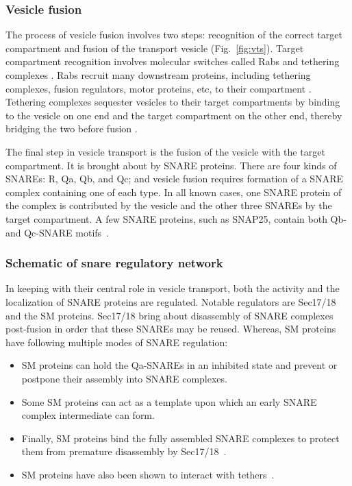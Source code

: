 \subsubsection{Vesicle fusion} 
The process of vesicle fusion involves two steps: recognition of the correct target compartment and fusion of the transport vesicle (Fig.~\ref{fig:vts}). 
%
Target compartment recognition involves molecular
switches called Rabs and tethering complexes \cite{rink2005rab}. 
%
Rabs recruit many downstream proteins, including tethering complexes, fusion regulators, motor proteins, etc, to their compartment \cite{muller2018molecular}. 
%
Tethering complexes sequester vesicles to their target compartments by binding to the vesicle on one end and the target compartment on the other end, thereby bridging the two
before fusion \cite{baker2016chaperoning}.

%
The final step in vesicle transport is the fusion of the vesicle with the target compartment. 
%
It is brought about by SNARE proteins.
%
There are four kinds of SNAREs: R, Qa, Qb, and Qc; and vesicle fusion requires formation of a SNARE complex containing one of each type. 
%
In all known cases, one SNARE protein of the complex is contributed by the vesicle and the other three SNAREs by the target compartment. 
%
A few SNARE proteins, such as SNAP25, contain both Qb- and Qc-SNARE motifs~\cite{yoon2018snare}.

\subsubsection{Schematic of snare regulatory network}
In keeping with their central role in vesicle transport, both the activity and the localization of SNARE proteins are regulated. Notable regulators are Sec17/18 and the SM proteins.
%
Sec17/18 bring about disassembly of SNARE complexes post-fusion in order that these SNAREs may be reused. 
%
Whereas, SM proteins have following multiple modes of SNARE regulation: 
\begin{itemize}
	\item SM proteins can hold
	the Qa-SNAREs in an inhibited state and prevent or postpone their assembly into SNARE
	complexes.
	\item Some SM proteins can act as a template upon which an early SNARE complex intermediate can form.
	\item Finally, SM proteins bind the fully assembled
	SNARE complexes to protect them from premature disassembly by Sec17/18~\cite{baker2016chaperoning}.
	\item SM proteins have also been shown to interact with tethers~\cite{yoon2018snare}.
\end{itemize}

